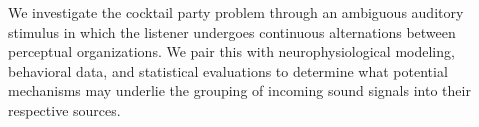 We investigate the cocktail party problem through an ambiguous auditory stimulus in which the listener undergoes continuous alternations between perceptual organizations. We pair this with neurophysiological modeling, behavioral data, and statistical evaluations to determine what potential mechanisms may underlie the grouping of incoming sound signals into their respective sources.